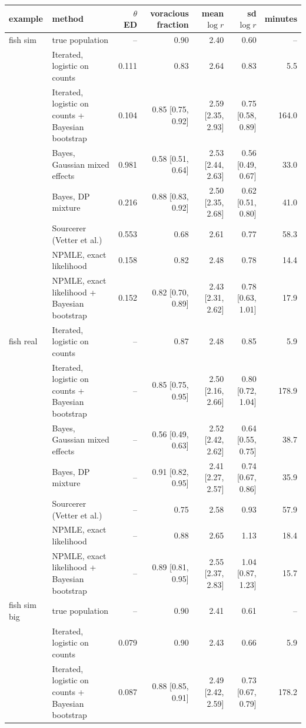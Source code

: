 \begin{tabular}{llrrrrr}
\toprule
example & method & $\theta$ ED & voracious fraction & mean $\log r$ & sd $\log r$ & minutes \\
\midrule
fish sim & true population & -- & 0.90 & 2.40 & 0.60 & -- \\
 & Iterated, logistic on counts & 0.111 & 0.83 & 2.64 & 0.83 & 5.5 \\
 & Iterated, logistic on counts + Bayesian bootstrap & 0.104 & 0.85 [0.75, 0.92] & 2.59 [2.35, 2.93] & 0.75 [0.58, 0.89] & 164.0 \\
 & Bayes, Gaussian mixed effects & 0.981 & 0.58 [0.51, 0.64] & 2.53 [2.44, 2.63] & 0.56 [0.49, 0.67] & 33.0 \\
 & Bayes, DP mixture & 0.216 & 0.88 [0.83, 0.92] & 2.50 [2.35, 2.68] & 0.62 [0.51, 0.80] & 41.0 \\
 & Sourcerer (Vetter et al.) & 0.553 & 0.68 & 2.61 & 0.77 & 58.3 \\
 & NPMLE, exact likelihood & 0.158 & 0.82 & 2.48 & 0.78 & 14.4 \\
 & NPMLE, exact likelihood + Bayesian bootstrap & 0.152 & 0.82 [0.70, 0.89] & 2.43 [2.31, 2.62] & 0.78 [0.63, 1.01] & 17.9 \\ \addlinespace
fish real & Iterated, logistic on counts & -- & 0.87 & 2.48 & 0.85 & 5.9 \\
 & Iterated, logistic on counts + Bayesian bootstrap & -- & 0.85 [0.75, 0.95] & 2.50 [2.16, 2.66] & 0.80 [0.72, 1.04] & 178.9 \\
 & Bayes, Gaussian mixed effects & -- & 0.56 [0.49, 0.63] & 2.52 [2.42, 2.62] & 0.64 [0.55, 0.75] & 38.7 \\
 & Bayes, DP mixture & -- & 0.91 [0.82, 0.95] & 2.41 [2.27, 2.57] & 0.74 [0.67, 0.86] & 35.9 \\
 & Sourcerer (Vetter et al.) & -- & 0.75 & 2.58 & 0.93 & 57.9 \\
 & NPMLE, exact likelihood & -- & 0.88 & 2.65 & 1.13 & 18.4 \\
 & NPMLE, exact likelihood + Bayesian bootstrap & -- & 0.89 [0.81, 0.95] & 2.55 [2.37, 2.83] & 1.04 [0.87, 1.23] & 15.7 \\ \addlinespace
fish sim big & true population & -- & 0.90 & 2.41 & 0.61 & -- \\
 & Iterated, logistic on counts & 0.079 & 0.90 & 2.43 & 0.66 & 5.9 \\
 & Iterated, logistic on counts + Bayesian bootstrap & 0.087 & 0.88 [0.85, 0.91] & 2.49 [2.42, 2.59] & 0.73 [0.67, 0.79] & 178.2 \\
\bottomrule
\end{tabular}
